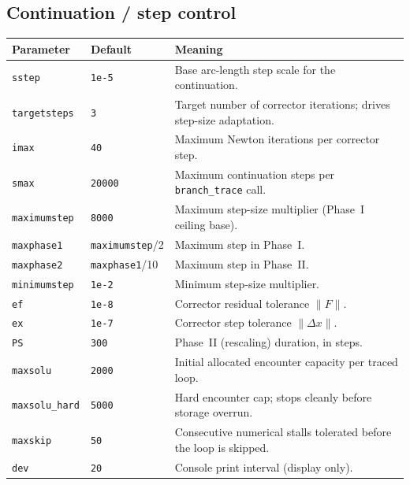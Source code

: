 \documentclass[11pt,a4paper]{article}
\newcommand{\code}[1]{\texttt{#1}}
\begin{document}
\subsection{Continuation / step control}
\begin{center}\small
\begin{longtable}{@{}p{}p{}p{}@{}}
\toprule
\textbf{Parameter} & \textbf{Default} & \textbf{Meaning}\\
\midrule\endhead
\code{sstep}        & \code{1e-5} & Base arc-length step scale for the continuation.\\
\code{targetsteps}  & \code{3}    & Target number of corrector iterations; drives step-size adaptation.\\
\code{imax}         & \code{40}   & Maximum Newton iterations per corrector step.\\
\code{smax}         & \code{20000}& Maximum continuation steps per \code{branch_trace} call.\\
\code{maximumstep}  & \code{8000} & Maximum step-size multiplier (Phase~I ceiling base).\\
\code{maxphase1}    & \code{maximumstep}/2 & Maximum step in Phase~I.\\
\code{maxphase2}    & \code{maxphase1}/10  & Maximum step in Phase~II.\\
\code{minimumstep}  & \code{1e-2} & Minimum step-size multiplier.\\
\code{ef}           & \code{1e-8} & Corrector residual tolerance $\lVert F\rVert$.\\
\code{ex}           & \code{1e-7} & Corrector step tolerance $\lVert \Delta x\rVert$.\\
\code{PS}           & \code{300}  & Phase~II (rescaling) duration, in steps.\\
\code{maxsolu}      & \code{2000} & Initial allocated encounter capacity per traced loop.\\
\code{maxsolu_hard} & \code{5000} & Hard encounter cap; stops cleanly before storage overrun.\\
\code{maxskip}      & \code{50}   & Consecutive numerical stalls tolerated before the loop is skipped.\\
\code{dev}          & \code{20}   & Console print interval (display only).\\
\bottomrule
\end{longtable}
\end{center}
\end{document}
